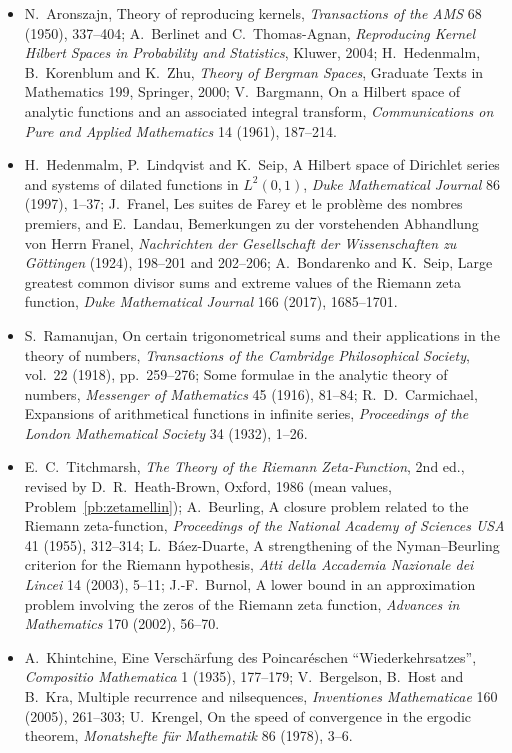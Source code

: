 \begin{itemize}
\item N.~Aronszajn, Theory of reproducing kernels, \emph{Transactions of the AMS} 68 (1950), 337--404; A.~Berlinet and C.~Thomas-Agnan, \emph{Reproducing Kernel Hilbert Spaces in
Probability and Statistics}, Kluwer, 2004; H.~Hedenmalm, B.~Korenblum and K.~Zhu, \emph{Theory of Bergman Spaces}, Graduate Texts in Mathematics 199, Springer, 2000;
V.~Bargmann, On a Hilbert space of analytic functions and an associated integral transform, \emph{Communications on Pure and Applied Mathematics} 14 (1961), 187--214.
\item H.~Hedenmalm, P.~Lindqvist and K.~Seip, A Hilbert space of Dirichlet series and systems of dilated functions in $L^2(0,1)$, \emph{Duke Mathematical Journal} 86 (1997), 1--37;
J.~Franel, Les suites de Farey et le problème des nombres premiers, and E.~Landau, Bemerkungen zu der vorstehenden Abhandlung von Herrn Franel, \emph{Nachrichten der Gesellschaft der
Wissenschaften zu Göttingen} (1924), 198--201 and 202--206; A.~Bondarenko and K.~Seip, Large greatest common divisor sums and extreme values of the Riemann zeta function, \emph{Duke
Mathematical Journal} 166 (2017), 1685--1701.
\item S.~Ramanujan, On certain trigonometrical sums and their applications in the theory of numbers, \emph{Transactions of the Cambridge Philosophical Society}, vol.~22 (1918), pp.~259--276;
Some formulae in the analytic theory of numbers, \emph{Messenger of Mathematics} 45 (1916), 81--84; R.~D.~Carmichael, Expansions of arithmetical functions in infinite series,
\emph{Proceedings of the London Mathematical Society} 34 (1932), 1--26.
\item E.~C.~Titchmarsh, \emph{The Theory of the Riemann Zeta-Function}, 2nd ed., revised by D.~R.~Heath-Brown, Oxford, 1986 (mean values, Problem~\ref{pb:zetamellin});
A.~Beurling, A closure problem related to the Riemann zeta-function, \emph{Proceedings of the National Academy of Sciences USA} 41 (1955), 312--314; L.~Báez-Duarte, A strengthening of
the Nyman--Beurling criterion for the Riemann hypothesis, \emph{Atti della Accademia Nazionale dei Lincei} 14 (2003), 5--11; J.-F.~Burnol, A lower bound in an approximation problem
involving the zeros of the Riemann zeta function, \emph{Advances in Mathematics} 170 (2002), 56--70.
\item A.~Khintchine, Eine Verschärfung des Poincaréschen ``Wiederkehrsatzes'', \emph{Compositio Mathematica} 1 (1935), 177--179; V.~Bergelson, B.~Host and B.~Kra, Multiple recurrence
and nilsequences, \emph{Inventiones Mathematicae} 160 (2005), 261--303; U.~Krengel, On the speed of convergence in the ergodic theorem, \emph{Monatshefte für Mathematik} 86 (1978), 3--6.

\end{itemize}
